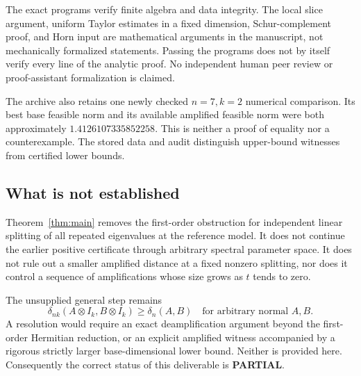 \documentclass[11pt]{article}
\theoremstyle{remark}\newtheorem{remark}[theorem]{Remark}
\newcommand{\dd}{\delta}
\begin{document}
The exact programs verify finite algebra and data integrity. The local slice argument, uniform Taylor estimates in a fixed dimension, Schur-complement proof, and Horn input are mathematical arguments in the manuscript, not mechanically formalized statements. Passing the programs does not by itself verify every line of the analytic proof. No independent human peer review or proof-assistant formalization is claimed.

The archive also retains one newly checked $n=7,k=2$ numerical comparison. Its best base feasible norm and its available amplified feasible norm were both approximately $1.4126107335852258$. This is neither a proof of equality nor a counterexample. The stored data and audit distinguish upper-bound witnesses from certified lower bounds.

\subsection{What is not established}
Theorem~\ref{thm:main} removes the first-order obstruction for independent linear splitting of all repeated eigenvalues at the reference model. It does not continue the earlier positive certificate through arbitrary spectral parameter space. It does not rule out a smaller amplified distance at a fixed nonzero splitting, nor does it control a sequence of amplifications whose size grows as $t$ tends to zero.

The unsupplied general step remains
\[
 \dd_{nk}(A\otimes I_k,B\otimes I_k)\ge\dd_n(A,B)
 \quad\text{for arbitrary normal }A,B.
\]
A resolution would require an exact deamplification argument beyond the first-order Hermitian reduction, or an explicit amplified witness accompanied by a rigorous strictly larger base-dimensional lower bound. Neither is provided here. Consequently the correct status of this deliverable is \textbf{PARTIAL}.
\end{document}
